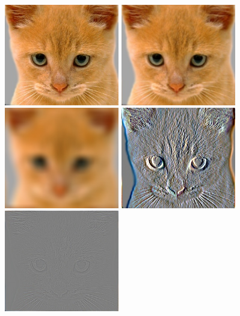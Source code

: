 	\begin{figure}[h]
		\centering
		\includegraphics[width=5cm]{../result/test/identity_image.jpg}
		\includegraphics[width=5cm]{../result/test/blur_image.jpg}
		\includegraphics[width=5cm]{../result/test/large_blur_image.jpg}
		\includegraphics[width=5cm]{../result/test/sobel_image.jpg}
		\includegraphics[width=5cm]{../result/test/high_pass_image.jpg}

\end{figure}

